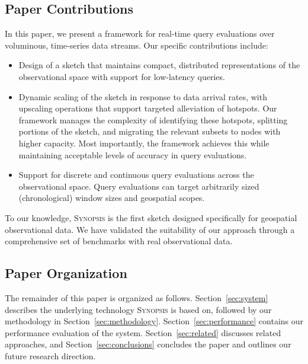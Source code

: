 \subsection{Paper Contributions}
In this paper, we present a framework for real-time query evaluations over voluminous, time-series data streams. Our specific contributions include:
\begin{itemize}
\item   Design of a sketch that maintains compact, distributed representations of the observational space with support for low-latency queries.

\item   Dynamic scaling of the sketch in response to data arrival rates, with upscaling operations that support targeted alleviation of hotspots. Our framework manages the complexity of identifying these hotspots, splitting portions of the sketch, and migrating the relevant subsets to nodes with higher capacity. Most importantly, the framework achieves this while maintaining acceptable levels of accuracy in query evaluations.

\item   Support for discrete and continuous query evaluations across the observational space. Query evaluations can target arbitrarily sized (chronological) window sizes and geospatial scopes.
\end{itemize}
To our knowledge, \textsc{Synopsis} is the first sketch designed specifically for geospatial observational data. We have validated the suitability of our approach through a comprehensive set of benchmarks with real observational data. 

\subsection{Paper Organization}
The remainder of this paper is organized as follows. Section~\ref{sec:system} describes the underlying technology \textsc{Synopsis} is based on, followed by our methodology in Section~\ref{sec:methodology}. Section~\ref{sec:performance} contains our performance evaluation of the system. Section~\ref{sec:related} discusses related approaches, and Section~\ref{sec:conclusions} concludes the paper and outlines our future research direction.

